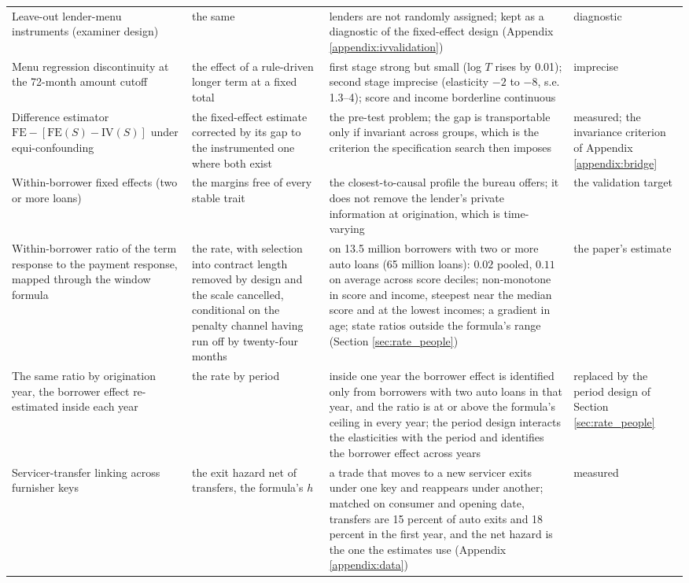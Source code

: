 \begin{footnotesize}
\begin{longtable}{@{}p{}p{}p{}p{}@{}}
Leave-out lender-menu instruments (examiner design) & the same & lenders are not randomly assigned; kept as a diagnostic of the fixed-effect design (Appendix \ref{appendix:ivvalidation}) & diagnostic \\
Menu regression discontinuity at the 72-month amount cutoff & the effect of a rule-driven longer term at a fixed total & first stage strong but small (log $T$ rises by 0.01); second stage imprecise (elasticity $-2$ to $-8$, s.e. 1.3--4); score and income borderline continuous & imprecise \\
Difference estimator $\text{FE} - [\text{FE}(S) - \text{IV}(S)]$ under equi-confounding & the fixed-effect estimate corrected by its gap to the instrumented one where both exist & the pre-test problem; the gap is transportable only if invariant across groups, which is the criterion the specification search then imposes & measured; the invariance criterion of Appendix \ref{appendix:bridge} \\
Within-borrower fixed effects (two or more loans) & the margins free of every stable trait & the closest-to-causal profile the bureau offers; it does not remove the lender's private information at origination, which is time-varying & the validation target \\
Within-borrower ratio of the term response to the payment response, mapped through the window formula & the rate, with selection into contract length removed by design and the scale cancelled, conditional on the penalty channel having run off by twenty-four months & on 13.5 million borrowers with two or more auto loans (65 million loans): $0.02$ pooled, $0.11$ on average across score deciles; non-monotone in score and income, steepest near the median score and at the lowest incomes; a gradient in age; state ratios outside the formula's range (Section \ref{sec:rate_people}) & the paper's estimate \\
The same ratio by origination year, the borrower effect re-estimated inside each year & the rate by period & inside one year the borrower effect is identified only from borrowers with two auto loans in that year, and the ratio is at or above the formula's ceiling in every year; the period design interacts the elasticities with the period and identifies the borrower effect across years & replaced by the period design of Section \ref{sec:rate_people} \\
Servicer-transfer linking across furnisher keys & the exit hazard net of transfers, the formula's $h$ & a trade that moves to a new servicer exits under one key and reappears under another; matched on consumer and opening date, transfers are 15 percent of auto exits and 18 percent in the first year, and the net hazard is the one the estimates use (Appendix \ref{appendix:data}) & measured \\

\end{longtable}
\end{footnotesize}
